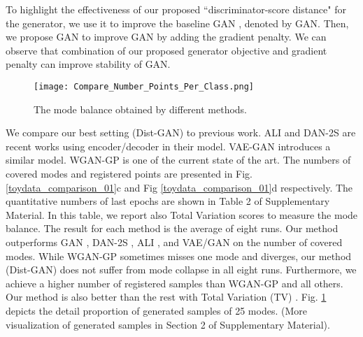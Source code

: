 \documentclass[runningheads]{llncs}
\begin{document}
To highlight the effectiveness of our proposed ``discriminator-score distance" for the generator, we use it to improve the baseline GAN \cite{goodfellow-nisp-2014}, denoted by GAN. Then, we propose GAN to improve GAN by adding the gradient penalty. We can observe that  combination of our proposed generator objective and gradient penalty can improve stability of  GAN.
\begin{figure}[t]
\centering
\texttt{[image: Compare\_Number\_Points\_Per\_Class.png]}
\caption{The mode balance obtained by different methods.}
\label{toydata_frequency}
\end{figure}
We compare our best setting (Dist-GAN) to previous work. ALI \cite{dumoulin-arxiv-2016} and DAN-2S \cite{li-arxiv-2017} are recent works using encoder/decoder in their model. VAE-GAN \cite{larsen-arxiv-2015} introduces a similar model. WGAN-GP \cite{gulrajani-arxiv-2017} is one of the current state of the art. The numbers of covered modes and registered points are presented in Fig. \ref{toydata_comparison_01}c and Fig \ref{toydata_comparison_01}d respectively. The quantitative numbers of last epochs are shown in Table 2 of Supplementary Material. In this table, we report also Total Variation scores to measure the mode balance. The result for each method is the average of eight runs. Our method outperforms GAN \cite{goodfellow-nisp-2014}, DAN-2S \cite{li-arxiv-2017}, ALI \cite{dumoulin-arxiv-2016}, and VAE/GAN \cite{larsen-arxiv-2015} on the number of covered modes. While WGAN-GP sometimes misses one mode and diverges, our method (Dist-GAN) does not suffer from  mode collapse in all eight runs. Furthermore, we achieve a higher number of registered samples than WGAN-GP and all others. Our method is also better than the rest with Total Variation (TV) \cite{li-arxiv-2017}. Fig. \ref{toydata_frequency} depicts the detail proportion of generated samples of 25 modes. (More visualization of generated samples in Section 2 of Supplementary Material).
\end{document}
